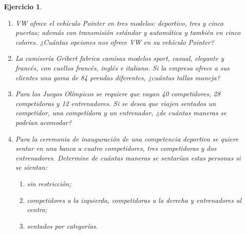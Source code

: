 \documentclass[12pt,twoside]{article}
\newtheorem{Ejer}{Ejercicio}
\begin{document}
\begin{Ejer}
\begin{enumerate}
\item VW ofrece el vehículo Pointer en tres modelos: deportivo, tres y cinco puertas; además con transmisión estándar y automática y también en cinco colores. ¿Cuántas opciones nos ofrece VW en su vehículo Pointer?

\item La camisería Gribert fabrica camisas modelos sport, casual, elegante y francés, con cuellos francés, inglés e italiano. Si la empresa ofrece a sus clientes una gama de 84 prendas diferentes, ¿cuántas tallas maneja?

\item Para los Juegos Olímpicos se requiere que vayan 40 competidores, 28 competidoras y 12 entrenadores. Si se desea que viajen sentados un competidor, una competidora y un entrenador, ¿de cuántas maneras se podrían acomodar?

\item Para la ceremonia de inauguración de una competencia deportiva se quiere sentar en una banca a cuatro competidores, tres competidoras y dos entrenadores. Determine de cuántas maneras se sentarían estas personas si se sientan:
\begin{enumerate}
\item sin restricción;
\item competidores a la izquierda, competidoras a la derecha y entrenadores al centro;
\item sentados por categorías.
\end{enumerate}

\end{enumerate}
\end{Ejer}
\end{document}
